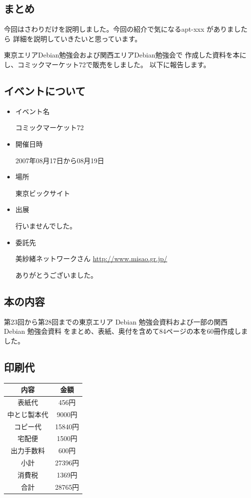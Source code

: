 \documentclass[mingoth,a4paper]{jsarticle}
\begin{document}
\subsection{まとめ}
今回はさわりだけを説明しました。今回の紹介で気になるapt-xxx がありましたら
詳細を説明していきたいと思っています。

%

\label{komike72}

東京エリアDebian勉強会および関西エリアDebian勉強会で
作成した資料を本にし、コミックマーケット72で販売をしました。
以下に報告します。

\subsection{イベントについて}
\begin{itemize}
 \item イベント名

	コミックマーケット72
 \item 開催日時

	2007年08月17日から08月19日
 \item 場所

	東京ビックサイト

 \item 出展

	行いませんでした。
 \item 委託先

	美紗緒ネットワークさん \url{http://www.misao.gr.jp/}

	ありがとうございました。
\end{itemize}
\subsection{本の内容}
第23回から第28回までの東京エリア Debian 勉強会資料および一部の関西 Debian 勉強会資料
をまとめ、表紙、奥付を含めて84ページの本を60冊作成しました。

\subsection{印刷代}
\begin{table}
\begin{center}

\begin{tabular}{|c|c|}
\hline
内容 & 金額\\
\hline
表紙代 & 456円\\
\hline
中とじ製本代 & 9000円 \\
\hline
コピー代 & 15840円 \\
\hline
宅配便 & 1500円 \\
\hline
出力手数料 & 600円 \\
\hline\hline
小計 & 27396円 \\
\hline\hline
消費税 & 1369円 \\
\hline\hline
合計 & 28765円 \\
\hline
\end{tabular}
\end{center}
\end{table}
\end{document}
